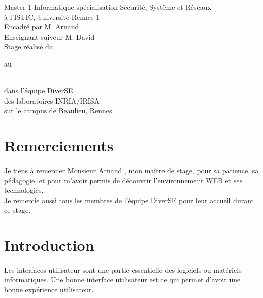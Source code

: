 \documentclass[11pt, a4paper, pdftex]{article}
\begin{document}
    \maketitle
    \thispagestyle{pagedegarde}
    \begin{center}
        \vspace{0.25cm} Master 1 Informatique spécialisation Sécurité, Système et Réseaux \\ à l'ISTIC, Université Rennes 1 \\
        \vspace{0.25cm} Encadré par M. Arnaud  \\
        \vspace{0.25cm} Enseignant suiveur M. David  \\
        \vspace{0.25cm} Stage réalisé du \date{15 mai 2018} au \date{31 août 2018} \\ \vspace{0.25cm} dans l'équipe DiverSE \\ des laboratoires INRIA/IRISA \\ sur le campus de Beaulieu, Rennes
    \end{center}


    \newpage
    \clearpage
    \setcounter{page}{1}
    \pagestyle{document}
    \section*{Remerciements}\label{sec:remerciement}
    \paragraph{}
    Je tiens à remercier Monsieur Arnaud , mon maître de stage, pour sa patience, sa pédagogie, et pour m'avoir permis de découvrir l'environnement WEB et ses technologies. \\
    Je remercie aussi tous les membres de l'équipe DiverSE pour leur accueil durant ce stage.
    \newpage

    \tableofcontents

    \newpage

    \section{Introduction}\label{sec:introduction}
        \paragraph{}
            Les interfaces utilisateur sont une partie essentielle des logiciels ou matériels informatiques.
            Une bonne interface utilisateur est ce qui permet d'avoir une bonne expérience utilisateur.
\end{document}

